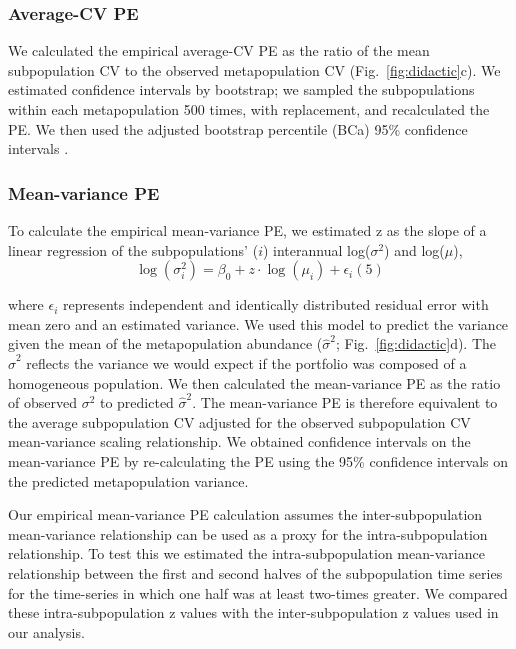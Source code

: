 \subsubsection{Average-CV PE}

We calculated the empirical average-CV PE as the ratio of the mean subpopulation
CV to the observed metapopulation CV (Fig.~\ref{fig:didactic}c). We estimated
confidence intervals by bootstrap; we sampled the subpopulations within each
metapopulation 500 times, with replacement, and recalculated the PE. We then
used the adjusted bootstrap percentile (BCa) 95\% confidence intervals
\citep{canty2012}.

\subsubsection{Mean-variance PE}

To calculate the empirical mean-variance PE, we estimated z as the slope of a
linear regression of the subpopulations' ($i$) interannual log($\sigma^2$) and
log($\mu$),
\begin{equation}
  \log(\sigma^2_i) = \beta_0 + z \cdot \log(\mu_i) + \epsilon_i (5)
  \label{eq:linear-taylor}
\end{equation}

\noindent where $\epsilon_i$ represents independent and identically distributed
residual error with mean zero and an estimated variance. We used this model to
predict the variance given the mean of the metapopulation abundance
($\hat\sigma^2$; Fig.~\ref{fig:didactic}d). The $\hat\sigma^2$ reflects the
variance we would expect if the portfolio was composed of a homogeneous
population. We then calculated the mean-variance PE as the ratio of
observed $\sigma^2$ to predicted $\hat\sigma^2$. The mean-variance PE is
therefore equivalent to
the average subpopulation CV adjusted for the observed subpopulation CV
mean-variance scaling relationship.
We obtained confidence intervals on the mean-variance PE by
re-calculating the PE using the 95\% confidence intervals on the predicted
metapopulation variance.

Our empirical mean-variance PE calculation assumes the inter-subpopulation
mean-variance relationship can be used as a proxy for the intra-subpopulation
relationship. To test this we estimated the intra-subpopulation mean-variance
relationship between the first and second halves of the subpopulation time
series for the time-series in which one half was at least two-times greater. We
compared these intra-subpopulation z values with the inter-subpopulation z
values used in our analysis.

